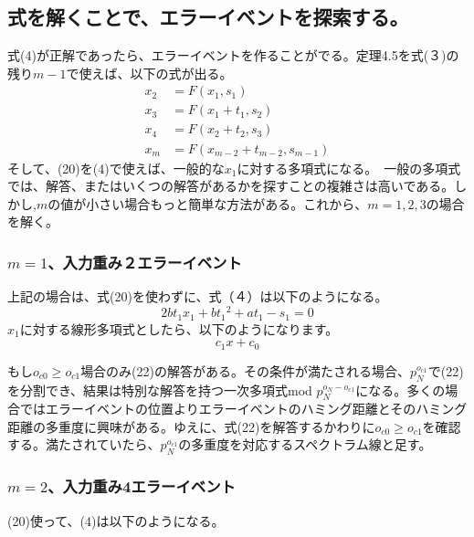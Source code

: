 \documentclass[20 pts]{article}
\begin{document}
\subsection{式を解くことで、エラーイベントを探索する。}
式(4)が正解であったら、エラーイベントを作ることがでる。定理4.5を式(３)の残り$m-1$で使えば、以下の式が出る。
\begin{align*}
x_2&=F(x_1, s_1 )\\
x_3&=F(x_1 +t_1,s_2 )\\
x_4&=F(x_2 +t_2,s_3 )\\
x_m&=F(x_{m-2} +t_{m-2},s_{m-1} )	\tag{20}
\end{align*}
そして、(20)を(4)で使えば、一般的な$x_1$に対する多項式になる。　一般の多項式では、解答、またはいくつの解答があるかを探すことの複雑さは高いである。しかし,$m$の値が小さい場合もっと簡単な方法がある。これから、$m=1,2,3$の場合を解く。
\newpage
\subsubsection{$m=1$、入力重み２エラーイベント}
上記の場合は、式(20)を使わずに、式（４）は以下のようになる。
\begin{equation}\tag{21}
2bt_1 x_1+b{t_1}^2+at_1-s_1=0	
\end{equation}				
$x_1$に対する線形多項式としたら、以下のようになります。
\begin{equation}\tag{22}
c_1 x+c_0
\end{equation}
						
もし$o_{c0}  \geq o_{c1}$場合のみ(22)の解答がある。その条件が満たされる場合、$p_N^{o_{c1}}$で(22)を分割でき、結果は特別な解答を持つ一次多項式mod $p_N^{o_N-o_{c1}}$になる。多くの場合ではエラーイベントの位置よりエラーイベントのハミング距離とそのハミング距離の多重度に興味がある。ゆえに、式(22)を解答するかわりに$o_{c0} \geq o_{c1}$を確認する。満たされていたら、$p_N^{o_{c1}}$の多重度を対応するスペクトラム線と足す。

\subsubsection{$m=2$、入力重み4エラーイベント}
(20)使って、(4)は以下のようになる。
\end{document}

